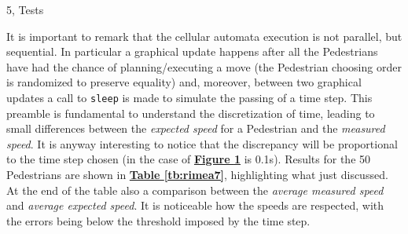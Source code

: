 \documentclass[10pt,a4paper]{article}
\begin{document}
\begin{task}{5, Tests}
\begin{figure}[H]
    \centering
    \hfill
    \hfill
    \caption{}
    \label{fig:rimea7}
\end{figure}

It is important to remark that the cellular automata execution is not parallel, but sequential. In particular a graphical update happens after all the Pedestrians have had the chance of planning/executing a move (the Pedestrian choosing order is randomized to preserve equality) and, moreover, between two graphical updates a call to \texttt{sleep} is made to simulate the passing of a time step. This preamble is fundamental to understand the discretization of time, leading to small differences between the \textit{expected speed} for a Pedestrian and the \textit{measured speed}. It is anyway interesting to notice that the discrepancy will be proportional to the time step chosen (in the case of \textbf{\hyperref[fig:rimea7]{Figure \ref{fig:rimea7}}} is 0.1s). Results for the 50 Pedestrians are shown in \textbf{\hyperref[tb:rimea7]{Table \ref{tb:rimea7}}}, highlighting what just discussed. At the end of the table also a comparison between the \textit{average measured speed} and \textit{average expected speed}. It is noticeable how the speeds are respected, with the errors being below the threshold imposed by the time step.


\end{task}
\end{document}

